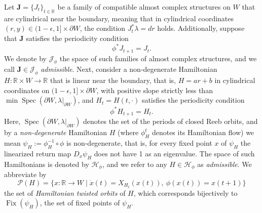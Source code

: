 \documentclass[12pt]{article}
\theoremstyle{theorem}
\theoremstyle{definition}
\theoremstyle{remark}
\numberwithin{equation}{section}
\newcommand{\p}{\partial}
\newcommand{\R}{{\mathbb{R}}}
\DeclareMathOperator{\Spec}{Spec}
\DeclareMathOperator{\Fix}{Fix}
\begin{document}
Let ${\bm J}=\{J_t\}_{t\in \R}$ be a family of compatible almost complex structures on $W$ that are cylindrical near the boundary, meaning that in cylindrical coordinates $(r,y)\in (1-\epsilon,1]\times \p W$, the condition $J_t^*\lambda=dr$ holds. 
Additionally, suppose that $\bm{J}$ satisfies the periodicity condition
$$
\phi^*J_{t+1}=J_t.
$$
We denote by $\mathcal{J}_\phi$ the space of such families of almost complex structures, and we call ${\bm J}\in \mathcal{J}_\phi$ \emph{admissible}.
Next, consider a non-degenerate Hamiltonian $H\colon \R \times W \to \R$ that is linear near the boundary, that is, $H=ar+b$ in cylindrical coordinates on $(1-\epsilon,1]\times \p W$, with positive slope strictly less than $\min \Spec(\p W, \lambda|_{\p W})$, and $H_t=H(t,\cdot)$ satisfies the periodicity condition
$$
\phi^*H_{t+1}=H_t.
$$
Here, $\Spec(\p W,\lambda|_{\p W})$ denotes the set of the periods of closed Reeb orbits, and by a \emph{non-degenerate} Hamiltonian $H$ (where $\phi_H^t$ denotes its Hamiltonian flow) we mean $\psi_H:=\phi_H^{-1}\circ \phi$ is non-degenerate, that is, for every fixed point $x$ of $\psi_H$ the linearized return map $D_x\psi_H$ does not have 1 as an eigenvalue.
The space of such Hamiltonians is denoted by $\mathcal{H}_{\phi}$, and we refer to any $H\in \mathcal{H}_\phi$ as \emph{admissible}.
We abbreviate by
$$
\mathcal{P}(H)=\{x\colon \R\to W \mid \dot{x}(t)=X_{H_t}(x(t)),\ \phi(x(t))=x(t+1)\}
$$
the set of \emph{Hamiltonian twisted orbits} of $H$, which corresponds bijectively to $\Fix(\psi_H)$, the set  of fixed points of $\psi_H$.
\end{document}
